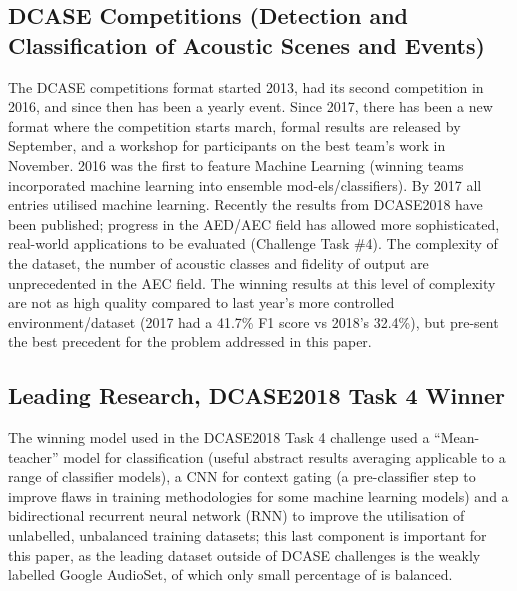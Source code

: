 \documentclass{UoNMCHA}
\numberwithin{equation}{section}
\begin{document}
\subsection{DCASE Competitions (Detection and Classification of Acoustic Scenes and Events)}
The DCASE competitions format started 2013, had its second competition in 2016, and since then has been a yearly event. Since 2017, there has been a new format where the competition starts march, formal results are released by September, and a workshop for participants on the best team’s work in November\cite{2018Schedule}. 2016 was the first to feature Machine Learning (winning teams incorporated machine learning into ensemble mod-els/classifiers). By 2017 all entries utilised machine learning. Recently the results from DCASE2018 have been published; progress in the AED/AEC field has allowed more sophisticated, real-world applications to be evaluated (Challenge Task \#4)\cite{2018n}. The complexity of the dataset, the number of acoustic classes and fidelity of output are unprecedented in the AEC field. The winning results at this level of complexity are not as high quality compared to last year’s more controlled environment/dataset (2017 had a 41.7\% F1 score\cite{2017results} vs 2018’s 32.4\%\cite{2018n}), but pre-sent the best precedent for the problem addressed in this paper.

\subsection{Leading Research, DCASE2018 Task 4 Winner}
The winning model used in the DCASE2018 Task 4 challenge used a “Mean-teacher” model for classification (useful abstract results averaging applicable to a range of classifier models), a CNN for context gating (a pre-classifier step to improve flaws in training methodologies for some machine learning models\cite{Yan16}) and a bidirectional recurrent neural network (RNN) to improve the utilisation of unlabelled, unbalanced training datasets\cite{winners}; this last component is important for this paper, as the leading dataset outside of DCASE challenges is the weakly labelled Google AudioSet, of which only small percentage of is balanced.
\end{document}

